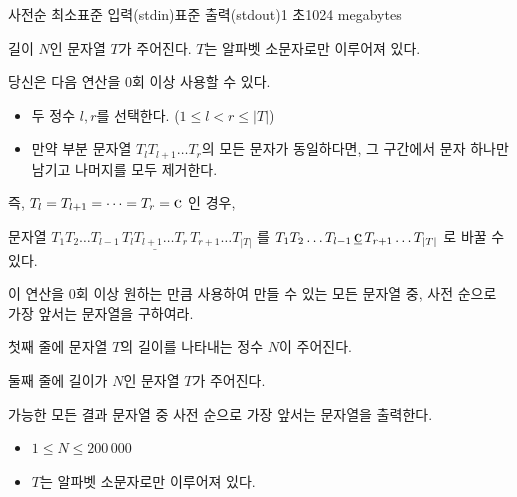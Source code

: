 \def\probtitle{사전순 최소}
\def\probno{D} %

\begin{problem}{\probtitle}{표준 입력(stdin)}{표준 출력(stdout)}{1 초}{1024 megabytes}

길이 $N$인 문자열 $T$가 주어진다. $T$는 알파벳 소문자로만 이루어져 있다.

당신은 다음 연산을 $0$회 이상 사용할 수 있다.

\begin{itemize}[topsep=0pt,noitemsep]
    \item 두 정수 $l, r$를 선택한다. ($1 \le l < r \le |T|$)
    \item 만약 부분 문자열 $T_l T_{l+1} \dots T_r$의 모든 문자가 동일하다면, 그 구간에서 문자 하나만 남기고 나머지를 모두 제거한다.
\end{itemize}

즉, $T_l = T_{l+1} = \cdots = T_r = \scalebox{1.3}{c}$ 인 경우,

문자열
$ T_1 T_2 \dots T_{l-1}\, \underline{T_l T_{l+1} \dots T_r}\, T_{r+1} \dots T_{|T|} $
를
$ T_1 T_2 \dots T_{l-1}\, \underline{\scalebox{1.3}{c}}\, T_{r+1} \dots T_{|T|} $
로 바꿀 수 있다.

이 연산을 0회 이상 원하는 만큼 사용하여 만들 수 있는 모든 문자열 중, 사전 순으로 가장 앞서는 문자열을 구하여라.

\InputFile

첫째 줄에 문자열 $T$의 길이를 나타내는 정수 $N$이 주어진다. 

둘째 줄에 길이가 $N$인 문자열 $T$가 주어진다.


\OutputFile

가능한 모든 결과 문자열 중 사전 순으로 가장 앞서는 문자열을 출력한다.

\Constraints

\begin{itemize}[topsep=0pt,noitemsep]
    \item $1 \le N \le 200\,000$
    \item $T$는 알파벳 소문자로만 이루어져 있다.
\end{itemize}

\Example

\begin{example}
\end{example}

\newpage

\Notes


\end{problem}
